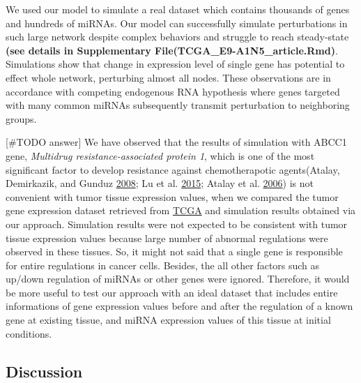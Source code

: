 \documentclass[a4,center,fleqn]{NAR}
\begin{document}
We used our model to simulate a real dataset which contains thousands of
genes and hundreds of miRNAs. Our model can successfully simulate
perturbations in such large network despite complex behaviors and
struggle to reach steady-state \textbf{(see details in Supplementary
File(TCGA\_E9-A1N5\_article.Rmd)}. Simulations show that change in
expression level of single gene has potential to effect whole network,
perturbing almost all nodes. These observations are in accordance with
competing endogenous RNA hypothesis where genes targeted with many
common miRNAs subsequently transmit perturbation to neighboring groups.

{[}\#TODO answer{]} We have observed that the results of simulation with
ABCC1 gene, \emph{Multidrug resistance-associated protein 1}, which is
one of the most significant factor to develop resistance against
chemotherapotic agents(Atalay, Demirkazik, and Gunduz
\protect\hyperlink{ref-atalay2008role}{2008}; Lu et al.
\protect\hyperlink{ref-lu2015microrna}{2015}; Atalay et al.
\protect\hyperlink{ref-atalay2006multidrug}{2006}) is not convenient
with tumor tissue expression values, when we compared the tumor gene
expression dataset retrieved from
\href{https://www.cancer.gov/about-nci/organization/ccg/research/structural-genomics/tcga}{TCGA}
and simulation results obtained via our approach. Simulation results
were not expected to be consistent with tumor tissue expression values
because large number of abnormal regulations were observed in these
tissues. So, it might not said that a single gene is responsible for
entire regulations in cancer cells. Besides, the all other factors such
as up/down regulation of miRNAs or other genes were ignored. Therefore,
it would be more useful to test our approach with an ideal dataset that
includes entire informations of gene expression values before and after
the regulation of a known gene at existing tissue, and miRNA expression
values of this tissue at initial conditions.

\hypertarget{discussion}{%
\subsection{Discussion}\label{discussion}}
\end{document}

